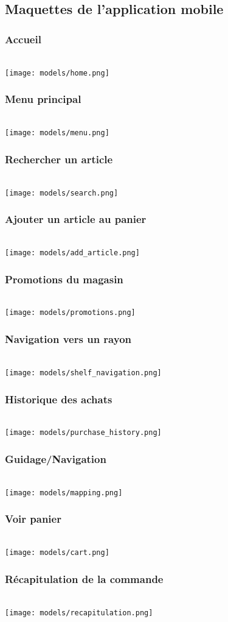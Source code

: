 \subsection{Maquettes de l'application mobile}
	\subsubsection{Accueil}
		~\\
		\texttt{[image: models/home.png]}
	\subsubsection{Menu principal}
		~\\
		\texttt{[image: models/menu.png]}
	\subsubsection{Rechercher un article}
		~\\
		\texttt{[image: models/search.png]}
	\subsubsection{Ajouter un article au panier}
		~\\
		\texttt{[image: models/add\_article.png]}
	\subsubsection{Promotions du magasin}
		~\\
		\texttt{[image: models/promotions.png]}
	\subsubsection{Navigation vers un rayon}
		~\\
		\texttt{[image: models/shelf\_navigation.png]}
	\subsubsection{Historique des achats}
		~\\
		\texttt{[image: models/purchase\_history.png]}
	\subsubsection{Guidage/Navigation}
		~\\
		\texttt{[image: models/mapping.png]}
	\subsubsection{Voir panier}
		~\\
		\texttt{[image: models/cart.png]}
	\subsubsection{Récapitulation de la commande}
		~\\
		\texttt{[image: models/recapitulation.png]}